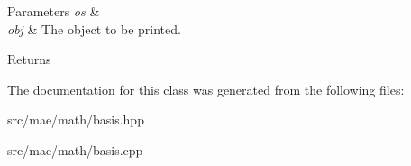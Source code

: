 \begin{DoxyParams}{Parameters}
{\em os} & \\
\hline
{\em obj} & The object to be printed. \\
\hline
\end{DoxyParams}
\begin{DoxyReturn}{Returns}

\end{DoxyReturn}


The documentation for this class was generated from the following files\-:\begin{DoxyCompactItemize}
\item 
src/mae/math/basis.\-hpp\item 
src/mae/math/basis.\-cpp\end{DoxyCompactItemize}
